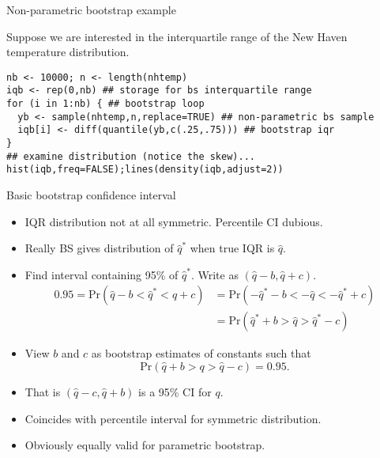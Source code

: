 \documentclass{beamer}
\newcommand{\eps}[3]
{{\begin{center}
 \rotatebox{#1}{\scalebox{#2}{\texttt{[image: \#3]}}}
 \end{center}}
}
\begin{document}
\begin{frame}[fragile]{Non-parametric bootstrap example}

Suppose we are interested in the interquartile range of the New Haven temperature distribution.  

{\scriptsize \begin{verbatim}
nb <- 10000; n <- length(nhtemp)
iqb <- rep(0,nb) ## storage for bs interquartile range
for (i in 1:nb) { ## bootstrap loop
  yb <- sample(nhtemp,n,replace=TRUE) ## non-parametric bs sample
  iqb[i] <- diff(quantile(yb,c(.25,.75))) ## bootstrap iqr
}
## examine distribution (notice the skew)...
hist(iqb,freq=FALSE);lines(density(iqb,adjust=2))
\end{verbatim}}
\eps{-90}{.5}{nht-np-bs.eps}
\end{frame}



\begin{frame}[fragile]{Basic bootstrap confidence interval}
\begin{itemize}
\item IQR distribution not at all symmetric. Percentile CI dubious.
\item Really BS gives distribution of $\hat q^*$ when true IQR is $\hat q$.
\item Find interval containing 95\% of $\hat q^*$. Write as $(\hat q-b,\hat q + c)$.
{\small \begin{align*}
0.95 = \text{Pr}(\hat q - b < \hat q^* <\hat q + c) &= \text{Pr}(-\hat q^* - b < -\hat q < -\hat q^* + c)\\ &= 
\text{Pr}(\hat q^* + b > \hat q > \hat q^* - c)
\end{align*}}
\item View $b$ and $c$ as bootstrap estimates of constants such that
$$\text{Pr}(\hat q + b > q > \hat q - c) = 0.95.
$$
\item That is $(\hat q - c,\hat q +b)$ is a 95\% CI for $q$.
\item Coincides with percentile interval for symmetric distribution.
\item Obviously equally valid for parametric bootstrap.

\end{itemize}
\end{frame}
\end{document}

